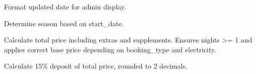 \documentclass[letterpaper,10pt,french]{sphinxmanual}
\begin{document}
\begin{fulllineitems}
\begin{fulllineitems}
\label{\detokenize{index:bookings.models.Booking.updated_at_display}}
\pysigstartsignatures
\pysiglinewithargsret
{}
{}
{}
\pysigstopsignatures
\sphinxAtStartPar
Format updated date for admin display.

\end{fulllineitems}


\begin{fulllineitems}
\label{\detokenize{index:bookings.models.Booking.get_season}}
\pysigstartsignatures
\pysiglinewithargsret
{}
{}
{}
\pysigstopsignatures
\sphinxAtStartPar
Determine season based on start\_date.

\end{fulllineitems}


\begin{fulllineitems}
\label{\detokenize{index:bookings.models.Booking.calculate_total_price}}
\pysigstartsignatures
\pysiglinewithargsret
{}
{}
{}
\pysigstopsignatures
\sphinxAtStartPar
Calculate total price including extras and supplements.
Ensures nights \textgreater{}= 1 and applies correct base price depending on booking\_type and electricity.

\end{fulllineitems}


\begin{fulllineitems}
\label{\detokenize{index:bookings.models.Booking.calculate_deposit}}
\pysigstartsignatures
\pysiglinewithargsret
{}
{}
{}
\pysigstopsignatures
\sphinxAtStartPar
Calculate 15\% deposit of total price, rounded to 2 decimals.

\end{fulllineitems}


\end{fulllineitems}
\end{document}
